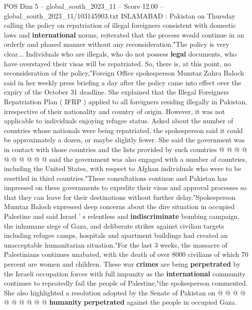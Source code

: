 \begin{textsample}{POS Dim 5 – global\_south\_2023\_11 – Score 12.00 – global\_south\_2023\_11/103145903.txt}  \label{ex:f5_pos_280}
ISLAMABAD : Pakistan on Thursday calling the policy on repatriation of illegal foreigners consistent with domestic laws and \textbf{international} norms, reiterated that the process would continue in an orderly and phased manner without any reconsideration."The policy is very clear...
Individuals who are illegals, who do not possess \textbf{legal} documents, who have overstayed their visas will be repatriated.
So, there is, at this point, no reconsideration of the policy,"Foreign Office spokesperson Mumtaz Zahra Baloch said in her weekly press briefing a day after the policy came into effect over the expiry of the October 31 deadline.
She explained that the Illegal Foreigners Repatriation Plan ( IFRP ) applied to all foreigners residing illegally in Pakistan, irrespective of their nationality and country of origin.
However, it was not applicable to individuals enjoying refugee status.
Asked about the number of countries whose nationals were being repatriated, the spokesperson said it could be approximately a dozen, or maybe slightly fewer.
She said the government was in contact with those countries and the lists provided by such countries @ @ @ @ @ @ @ @ @ @ said the government was also engaged with a number of countries, including the United States, with respect to Afghan individuals who were to be resettled in third countries."These consultations continue and Pakistan has impressed on these governments to expedite their visas and approval processes so that they can leave for their destinations without further delay."Spokesperson Mumtaz Baloch expressed deep concerns about the dire situation in occupied Palestine and said Israel ' s relentless and \textbf{indiscriminate} bombing campaign, the inhumane siege of Gaza, and deliberate strikes against civilian targets including refugee camps, hospitals and apartment buildings had created an unacceptable humanitarian situation."For the last 3 weeks, the massacre of Palestinians continues unabated, with the death of over 8000 civilians of which 70 percent are women and children.
These war \textbf{crimes} are being \textbf{perpetrated} by the Israeli occupation forces with full impunity as the \textbf{international} community continues to repeatedly fail the people of Palestine,"the spokesperson commented.
She also highlighted a resolution adopted by the Senate of Pakistan on @ @ @ @ @ @ @ @ @ @ \textbf{humanity} \textbf{perpetrated} against the people in occupied Gaza.

\end{textsample}
